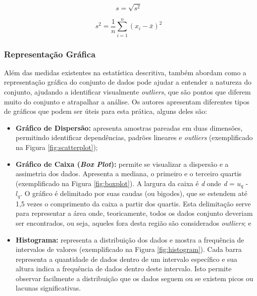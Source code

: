\[
\textit{s} = \sqrt{s^2}
\]

\[
s^2 = \frac{1}{n} \sum_{i=1}^{n} (x_i - \bar{x})^2
\]


\subsubsection{Representação Gráfica}

Além das medidas existentes na estatística descritiva,  também abordam como a representação gráfica do conjunto de dados pode ajudar a entender a natureza do conjunto, ajudando a identificar visualmente \textit{outliers}, que são pontos que diferem muito do conjunto e atrapalhar a análise. Os autores apresentam diferentes tipos de gráficos que podem ser úteis para esta prática, alguns deles são:

\begin{itemize}
    \item \textbf{Gráfico de Dispersão:} apresenta amostras pareadas em duas dimensões, permitindo identificar dependências, padrões lineares e \textit{outliers} (exemplificado na Figura \ref{fig:scatterplot});
    \item \textbf{Gráfico de Caixa (\textit{Box Plot}):} permite se visualizar a dispersão e a assimetria dos dados. Apresenta a mediana, o primeiro e o terceiro quartis (exemplificado na Figura \ref{fig:boxplot}). A largura da caixa é \textit{d} onde \textit{d} = \(u_q\) - \(l_q\). O gráfico é delimitado por suas caudas (ou bigodes), que se estendem até 1,5 vezes o comprimento da caixa a partir dos quartis. Esta delimitação serve para representar a área onde, teoricamente, todos os dados conjunto deveriam ser encontrados, ou seja, aqueles fora desta região são considerados \textit{outliers}; e
    \item \textbf{Histograma:} representa a distribuição dos dados e mostra a frequência de intervalos de valores (exemplificado na Figura \ref{fig:histogram}). Cada barra representa a quantidade de dados dentro de um intervalo específico e sua altura indica a frequência de dados dentro deste intervalo. Isto permite observar facilmente a distribuição que os dados seguem ou se existem picos ou lacunas significativas.
\end{itemize}

